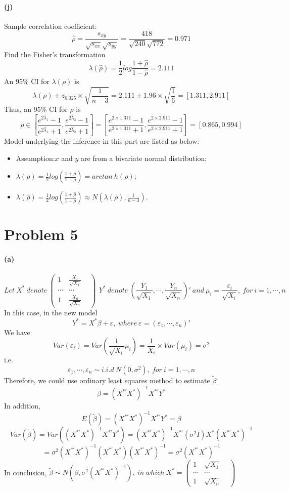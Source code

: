 \documentclass{article}
\begin{document}
\paragraph{(j)}
Sample correlation coefficient:
$$\hat{\rho}=\frac{s_{xy}}{\sqrt{s_{xx}}\sqrt{s_{yy}}}=\frac{418}{\sqrt{240}\sqrt{772}}=0.971$$
Find the Fisher's transformation
$$\lambda(\hat{\rho})=\frac{1}{2}log{\frac{1+\hat{\rho}}{1-\hat{\rho}}}=2.111$$
An 95\% CI for $\lambda(\rho)$ is 
$$\lambda(\rho)\pm z_{0.025}\times \sqrt{\frac{1}{n-3}}=2.111\pm 1.96\times \sqrt{\frac{1}{6}}=[1.311,2.911]$$
Thus, an 95\% CI for $\rho$ is
$$\rho \in [\frac{e^{2\hat{\lambda}_1}-1}{e^{2\hat{\lambda}_1}+1},\frac{e^{2\hat{\lambda}_2}-1}{e^{2\hat{\lambda}_2}+1}]
=[\frac{e^{2\times 1.311}-1}{e^{2\times 1.311}+1},\frac{e^{2\times 2.911}-1}{e^{2\times 2.911}+1}]=[0.865,0.994]$$
Model underlying the inference in this part are listed as below:
\begin{itemize}
	\item Assumption:$x$ and $y$ are from a bivariate normal distribution;
	\item $\lambda(\rho)=\frac{1}{2}log(\frac{1+\rho}{1-\rho})=arctan\ h(\rho)$;
	\item $\lambda(\hat{\rho})=\frac{1}{2}log(\frac{1+\hat{\rho}}{1-\hat{\rho}})\approx N(\lambda(\rho),\frac{1}{n-3})$.
\end{itemize}


\section{Problem 5}

\paragraph{(a)}
 \[Let\ X^*\ denote \ \begin{pmatrix}
1& \frac{X_1}{\sqrt{X_1}}&\\ 
\cdots& \cdots& \\ 
1& \frac{X_n}{\sqrt{X_n}}&
\end{pmatrix} \ \, Y^* \ denote\ (\frac{Y_1}{\sqrt{X_1}},\cdots,\frac{Y_n}{\sqrt{X_n}})'\ and\ \mu_i = \frac{\varepsilon_i}{\sqrt{X_i}} ,\ for\ i= 1,\cdots,n 
\]
In this case, in the new model 
\[Y^*=X^*\beta+\varepsilon ,\ where\ \varepsilon=(\varepsilon_1,\cdots,\varepsilon_n)'\]
We have 
\[Var(\varepsilon_i)=Var(\frac{1}{\sqrt{X_i}}\mu_i)=\frac{1}{X_i}\times Var(\mu_i)=\sigma^2\]
i.e.
\[\varepsilon_1,\cdots,\varepsilon_n \sim i.i.d \ N(0,\sigma^2),\ for\ i= 1,\cdots,n\]
Therefore, we could use ordinary least squares method to estimate $\tilde{\beta}$
\[\tilde \beta=(X^{*'}X^*)^{-1}X^{*'}Y^* \]
In addition,
\[E(\tilde \beta)=(X^{*'}X^*)^{-1}X^{*'}Y^*=\beta\]
\[Var(\tilde \beta)=Var((X^{*'}X^*)^{-1}X^{*'}Y^*)=(X^{*'}X^*)^{-1}X^{*'}(\sigma^2I)X^*(X^{*'}X^*)^{-1}\]
\[=\sigma^2(X^{*'}X^*)^{-1}(X^{*'}X^*)(X^{*'}X^*)^{-1} =\sigma^2(X^{*'}X^*)^{-1}\]
In conclusion, $\tilde \beta \sim N(\beta,\sigma^2(X^{*'}X^*)^{-1}),\ in\ which\ X^*=\begin{pmatrix}
1& \sqrt{X_1}&\\ 
\cdots& \cdots& \\ 
1& \sqrt{X_n}&
\end{pmatrix}$
\end{document}
